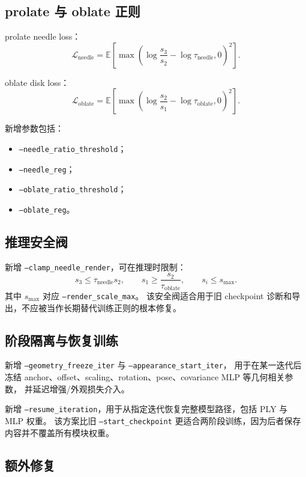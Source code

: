\documentclass[11pt,a4paper]{article}
\begin{document}
\subsection{prolate 与 oblate 正则}

prolate needle loss：
\[
  \mathcal{L}_{\text{needle}}
  =
  \mathbb{E}
  \left[
    \max\left(
      \log \frac{s_3}{s_2} - \log \tau_{\text{needle}},
      0
    \right)^2
  \right].
\]

oblate disk loss：
\[
  \mathcal{L}_{\text{oblate}}
  =
  \mathbb{E}
  \left[
    \max\left(
      \log \frac{s_2}{s_1} - \log \tau_{\text{oblate}},
      0
    \right)^2
  \right].
\]

新增参数包括：
\begin{itemize}[leftmargin=1.5em]
  \item \texttt{--needle\_ratio\_threshold}；
  \item \texttt{--needle\_reg}；
  \item \texttt{--oblate\_ratio\_threshold}；
  \item \texttt{--oblate\_reg}。
\end{itemize}

\subsection{推理安全阀}

新增 \texttt{--clamp\_needle\_render}，可在推理时限制：
\[
  s_3 \le \tau_{\text{needle}} s_2,
  \qquad
  s_1 \ge \frac{s_2}{\tau_{\text{oblate}}},
  \qquad
  s_i \le s_{\max}.
\]
其中 \(s_{\max}\) 对应 \texttt{--render\_scale\_max}。
该安全阀适合用于旧 checkpoint 诊断和导出，不应被当作长期替代训练正则的根本修复。

\subsection{阶段隔离与恢复训练}

新增 \texttt{--geometry\_freeze\_iter} 与 \texttt{--appearance\_start\_iter}，
用于在某一迭代后冻结 anchor、offset、scaling、rotation、pose、covariance MLP 等几何相关参数，
并延迟增强/外观损失介入。

新增 \texttt{--resume\_iteration}，用于从指定迭代恢复完整模型路径，包括 PLY 与 MLP 权重。
该方案比旧 \texttt{--start\_checkpoint} 更适合两阶段训练，因为后者保存内容并不覆盖所有模块权重。

\subsection{额外修复}
\end{document}

